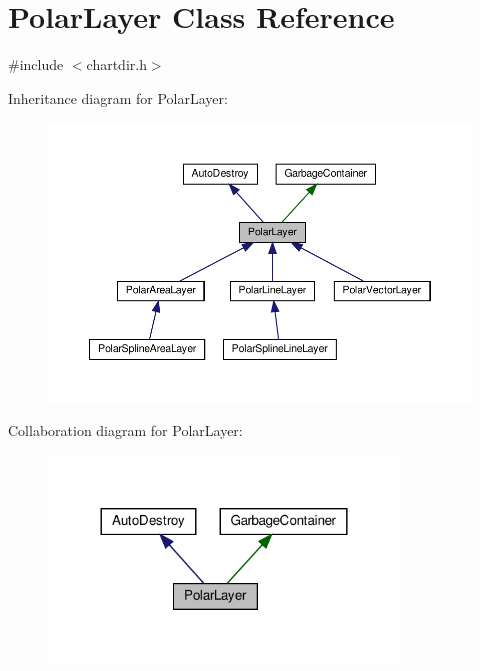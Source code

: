 \hypertarget{class_polar_layer}{}\section{Polar\+Layer Class Reference}
\label{class_polar_layer}


{\ttfamily \#include $<$chartdir.\+h$>$}



Inheritance diagram for Polar\+Layer\+:
\nopagebreak
\begin{figure}[H]
\begin{center}
\leavevmode
\includegraphics[width=350pt]{class_polar_layer__inherit__graph}
\end{center}
\end{figure}


Collaboration diagram for Polar\+Layer\+:
\nopagebreak
\begin{figure}[H]
\begin{center}
\leavevmode
\includegraphics[width=264pt]{class_polar_layer__coll__graph}
\end{center}
\end{figure}
